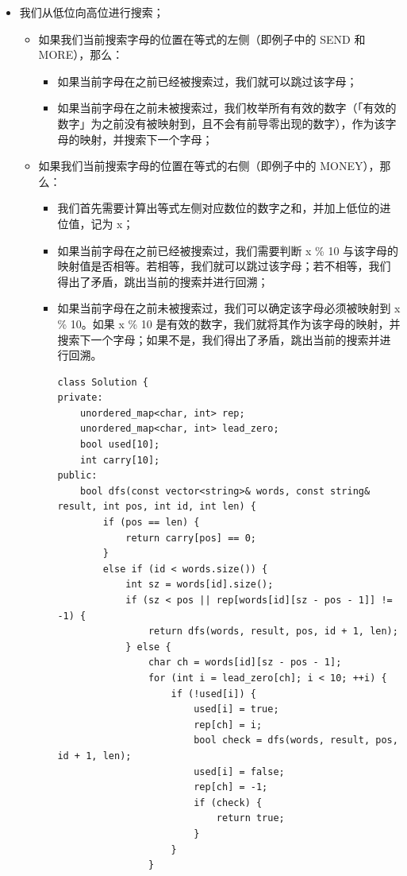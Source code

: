 \documentclass[9pt, b5paaper]{book}
\begin{document}
\begin{enumerate}
\begin{itemize}
\item 我们从低位向高位进行搜索；
\begin{itemize}
\item 如果我们当前搜索字母的位置在等式的左侧（即例子中的 SEND 和 MORE），那么：
\begin{itemize}
\item 如果当前字母在之前已经被搜索过，我们就可以跳过该字母；
\item 如果当前字母在之前未被搜索过，我们枚举所有有效的数字（「有效的数字」为之前没有被映射到，且不会有前导零出现的数字），作为该字母的映射，并搜索下一个字母；
\end{itemize}
\item 如果我们当前搜索字母的位置在等式的右侧（即例子中的 MONEY），那么：
\begin{itemize}
\item 我们首先需要计算出等式左侧对应数位的数字之和，并加上低位的进位值，记为 x；
\item 如果当前字母在之前已经被搜索过，我们需要判断 x \% 10 与该字母的映射值是否相等。若相等，我们就可以跳过该字母；若不相等，我们得出了矛盾，跳出当前的搜索并进行回溯；
\item 如果当前字母在之前未被搜索过，我们可以确定该字母必须被映射到 x \% 10。如果 x \% 10 是有效的数字，我们就将其作为该字母的映射，并搜索下一个字母；如果不是，我们得出了矛盾，跳出当前的搜索并进行回溯。
\begin{verbatim}
class Solution {
private:
    unordered_map<char, int> rep;
    unordered_map<char, int> lead_zero;
    bool used[10];
    int carry[10];
public:
    bool dfs(const vector<string>& words, const string& result, int pos, int id, int len) {
        if (pos == len) {
            return carry[pos] == 0;
        }
        else if (id < words.size()) {
            int sz = words[id].size();
            if (sz < pos || rep[words[id][sz - pos - 1]] != -1) {
                return dfs(words, result, pos, id + 1, len);
            } else {
                char ch = words[id][sz - pos - 1];
                for (int i = lead_zero[ch]; i < 10; ++i) {
                    if (!used[i]) {
                        used[i] = true;
                        rep[ch] = i;
                        bool check = dfs(words, result, pos, id + 1, len);
                        used[i] = false;
                        rep[ch] = -1;
                        if (check) {
                            return true;
                        }
                    }
                }

\end{verbatim}
\end{itemize}
\end{itemize}
\end{itemize}
\end{enumerate}
\end{document}
